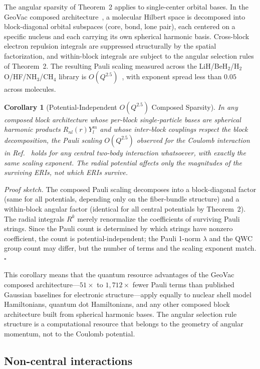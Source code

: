 \documentclass[twocolumn,pra,amsmath,amssymb,superscriptaddress]{revtex4-2}
\begin{document}
The angular sparsity of Theorem~2 applies to single-center orbital
bases.  In the GeoVac composed architecture~\cite{GeoVac_Paper14,
GeoVac_Paper17}, a molecular Hilbert space is decomposed into
block-diagonal orbital subspaces (core, bond, lone pair), each
centered on a specific nucleus and each carrying its own spherical
harmonic basis.  Cross-block electron repulsion integrals are
suppressed structurally by the spatial factorization, and
within-block integrals are subject to the angular selection rules
of Theorem~2.  The resulting Pauli scaling measured across the
LiH/BeH$_2$/H$_2$O/HF/NH$_3$/CH$_4$ library is
$O(Q^{2.5})$~\cite{GeoVac_Paper14}, with exponent spread less than
$0.05$ across molecules.

\medskip
\noindent\textbf{Corollary 1} (Potential-Independent $O(Q^{2.5})$
Composed Sparsity). \textit{In any composed block architecture
whose per-block single-particle bases are spherical harmonic
products $R_{nl}(r) Y_l^m$ and whose inter-block couplings respect
the block decomposition, the Pauli scaling $O(Q^{2.5})$ observed for
the Coulomb interaction in
Ref.~\cite{GeoVac_Paper14} holds for any central two-body interaction
whatsoever, with exactly the same scaling exponent.  The radial
potential affects only the magnitudes of the surviving ERIs, not
which ERIs survive.}

\textit{Proof sketch.}  The composed Pauli scaling decomposes into a
block-diagonal factor (same for all potentials, depending only on
the fiber-bundle structure) and a within-block angular factor
(identical for all central potentials by Theorem~2).  The radial
integrals $R^k$ merely renormalize the coefficients of surviving
Pauli strings.  Since the Pauli count is determined by which strings
have nonzero coefficient, the count is potential-independent; the
Pauli 1-norm $\lambda$ and the QWC group count may differ, but the
number of terms and the scaling exponent match.  \hfill$\square$

This corollary means that the quantum resource advantages of the
GeoVac composed architecture---$51\times$ to $1{,}712\times$ fewer
Pauli terms than published Gaussian baselines for electronic
structure---apply equally to nuclear shell model Hamiltonians,
quantum dot Hamiltonians, and any other composed block architecture
built from spherical harmonic bases.  The angular selection rule
structure is a computational resource that belongs to the geometry
of angular momentum, not to the Coulomb potential.

\subsection{Non-central interactions}
\end{document}
